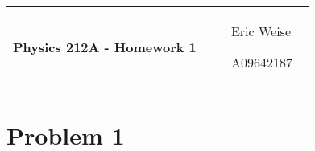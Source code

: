 \documentclass{article}
\newcommand{\assignment}[1]{
    \newpage
    \begin{tabular}{p{0.65\linewidth}p{0.25\linewidth}}
        {\bf\LARGE Physics 212A - Homework #1 }
        &
        \parbox[b]{0.24\textwidth}{
            \hfill Eric Weise

            \hfill A09642187
            }
    \end{tabular}
\newline
}
\begin{document}
\assignment{1}
\section*{Problem 1}
\end{document}
